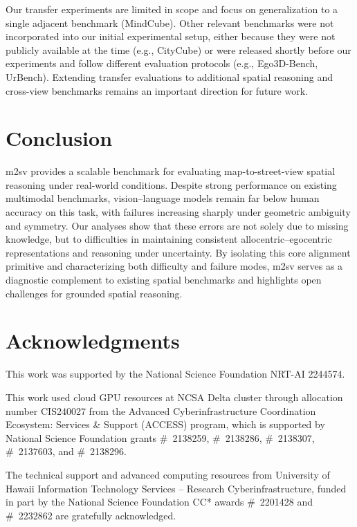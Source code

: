 \documentclass{article}
\begin{document}
Our transfer experiments are limited in scope and focus on generalization to a
single adjacent benchmark (MindCube). Other relevant benchmarks were not
incorporated into our initial experimental setup, either because they were not
publicly available at the time (e.g., CityCube) or were released shortly before
our experiments and follow different evaluation protocols (e.g., Ego3D-Bench,
UrBench). Extending transfer evaluations to additional spatial reasoning and
cross-view benchmarks remains an important direction for future work.

\section{Conclusion}

m2sv provides a scalable benchmark for evaluating map-to-street-view spatial
reasoning under real-world conditions. Despite strong performance on existing
multimodal benchmarks, vision–language models remain far below human accuracy on
this task, with failures increasing sharply under geometric ambiguity and
symmetry. Our analyses show that these errors are not solely due to missing
knowledge, but to difficulties in maintaining consistent allocentric–egocentric
representations and reasoning under uncertainty. By isolating this core alignment
primitive and characterizing both difficulty and failure modes, m2sv serves as a
diagnostic complement to existing spatial benchmarks and highlights open
challenges for grounded spatial reasoning.

\section*{Acknowledgments}
\label{sec:acknowledgments}

This work was supported by the National Science Foundation NRT-AI 2244574.

This work used cloud GPU resources at NCSA Delta cluster through allocation number
CIS240027 from the Advanced Cyberinfrastructure Coordination Ecosystem: Services
\& Support (ACCESS) program, which is supported by National Science Foundation
grants \#~2138259, \#~2138286, \#~2138307, \#~2137603, and \#~2138296.

The technical support and advanced computing resources from University of Hawaii
Information Technology Services -- Research Cyberinfrastructure, funded in part by
the National Science Foundation CC* awards \#~2201428 and \#~2232862 are gratefully
acknowledged.
\end{document}
